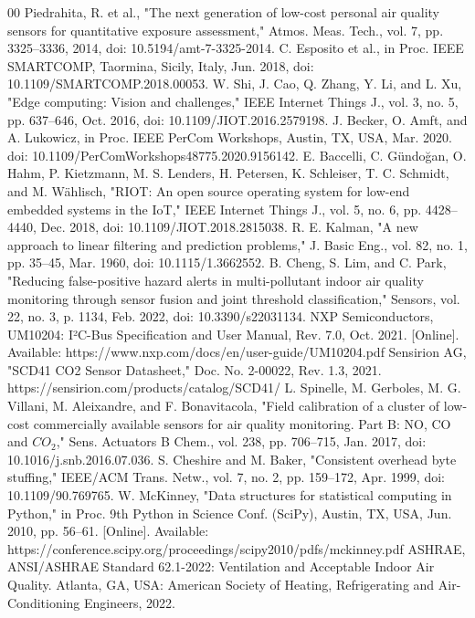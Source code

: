 \documentclass[conference]{IEEEtran}
\begin{document}
\begin{thebibliography}{00}
 Piedrahita, R. et al., "The next generation of low-cost personal air quality sensors for quantitative exposure assessment," Atmos. Meas. Tech., vol. 7, pp. 3325–3336, 2014, doi: 10.5194/amt-7-3325-2014.
 C. Esposito et al., in Proc. IEEE SMARTCOMP, Taormina, Sicily, Italy, Jun. 2018, doi: 10.1109/SMARTCOMP.2018.00053.
 W. Shi, J. Cao, Q. Zhang, Y. Li, and L. Xu, "Edge computing: Vision and challenges," IEEE Internet Things J., vol. 3, no. 5, pp. 637–646, Oct. 2016, doi: 10.1109/JIOT.2016.2579198.
 J. Becker, O. Amft, and A. Lukowicz, in Proc. IEEE PerCom Workshops, Austin, TX, USA, Mar. 2020. doi: 10.1109/PerComWorkshops48775.2020.9156142.
 E. Baccelli, C. Gündoğan, O. Hahm, P. Kietzmann, M. S. Lenders, H. Petersen, K. Schleiser, T. C. Schmidt, and M. Wählisch, "RIOT: An open source operating system for low-end embedded systems in the IoT," IEEE Internet Things J., vol. 5, no. 6, pp. 4428–4440, Dec. 2018, doi: 10.1109/JIOT.2018.2815038.
 R. E. Kalman, "A new approach to linear filtering and prediction problems," J. Basic Eng., vol. 82, no. 1, pp. 35–45, Mar. 1960, doi: 10.1115/1.3662552.
 B. Cheng, S. Lim, and C. Park, "Reducing false-positive hazard alerts in multi-pollutant indoor air quality monitoring through sensor fusion and joint threshold classification," Sensors, vol. 22, no. 3, p. 1134, Feb. 2022, doi: 10.3390/s22031134.
 NXP Semiconductors, UM10204: I²C-Bus Specification and User Manual, Rev. 7.0, Oct. 2021. [Online]. Available: https://www.nxp.com/docs/en/user-guide/UM10204.pdf
 Sensirion AG, "SCD41 CO2 Sensor Datasheet," Doc. No. 2-00022, Rev. 1.3, 2021. https://sensirion.com/products/catalog/SCD41/  
 L. Spinelle, M. Gerboles, M. G. Villani, M. Aleixandre, and F. Bonavitacola, "Field calibration of a cluster of low-cost commercially available sensors for air quality monitoring. Part B: NO, CO and $CO_2$," Sens. Actuators B Chem., vol. 238, pp. 706–715, Jan. 2017, doi: 10.1016/j.snb.2016.07.036.
 S. Cheshire and M. Baker, "Consistent overhead byte stuffing," IEEE/ACM Trans. Netw., vol. 7, no. 2, pp. 159–172, Apr. 1999, doi: 10.1109/90.769765.
 W. McKinney, "Data structures for statistical computing in Python," in Proc. 9th Python in Science Conf. (SciPy), Austin, TX, USA, Jun. 2010, pp. 56–61. [Online]. Available: https://conference.scipy.org/proceedings/scipy2010/pdfs/mckinney.pdf
 ASHRAE, ANSI/ASHRAE Standard 62.1-2022: Ventilation and Acceptable Indoor Air Quality. Atlanta, GA, USA: American Society of Heating, Refrigerating and Air-Conditioning Engineers, 2022.

\end{thebibliography}
\end{document}
